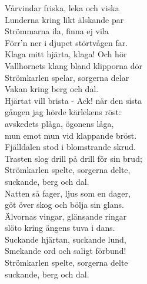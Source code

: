 \documentclass[a6paper, 10pt, twoside]{article}
\begin{document}
\noindent
\begin{center}
\end{center}
\begin{lyrics}
Vårvindar friska, leka och viska\\
Lunderna kring likt älskande par\\
Strömmarna ila, finna ej vila\\
Förr'n ner i djupet störtvågen far.\\
Klaga mitt hjärta, klaga! Och hör\\
Vallhornets klang bland klipporna dör\\
Strömkarlen spelar, sorgerna delar\\
Vakan kring berg och dal.
\vspace{5pt}\\
Hjärtat vill brista - Ack! när den sista\\
gången jag hörde kärlekens röst:\\
avskedets plåga, ögonens låga,\\
mun emot mun vid klappande bröst.\\
Fjälldalen stod i blomstrande skrud.\\
Trasten slog drill på drill för sin brud;\\
Strömkarlen spelte, sorgerna delte,\\
suckande, berg och dal.
\vspace{5pt}\\
Natten så fager, ljus som en dager,\\
göt över skog och bölja sin glans.\\
Älvornas vingar, glänsande ringar\\
slöto kring ängens tuva i dans.\\
Suckande hjärtan, suckande lund,\\
Smekande ord och saligt förbund!\\
Strömkarlen spelte, sorgerna delte\\
suckande, berg och dal.


\end{lyrics}
\end{document}
